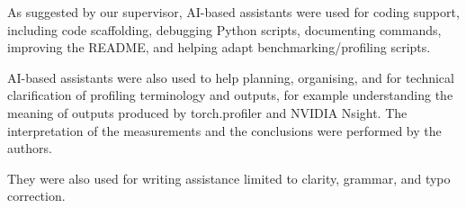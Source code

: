 \documentclass{article}
\begin{document}
As suggested by our supervisor, AI-based assistants were used for coding support, including code scaffolding, debugging Python scripts, documenting commands, improving the README, and helping adapt benchmarking/profiling scripts. 

AI-based assistants were also used to help planning, organising, and for technical clarification of profiling terminology and outputs, for example understanding the meaning of outputs produced by torch.profiler and NVIDIA Nsight. The interpretation of the measurements and the conclusions were performed by the authors.

They were also used for writing assistance limited to clarity, grammar, and typo correction. 

  
\end{document}
